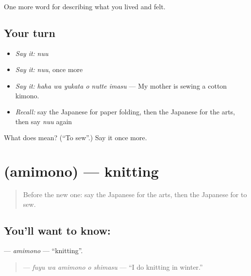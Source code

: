\begin{grammarlens}[title={What you've built}]
One more word for describing what you lived and felt.
\end{grammarlens}

\subsection*{Your turn}
\begin{itemize}
\raggedright
  \item \emph{Say it:} \emph{nuu}
  \item \emph{Say it:} \emph{nuu}, once more
  \item \emph{Say it:} \emph{haha wa yukata o nutte imasu} — My mother is sewing a cotton kimono.
  \item \emph{Recall:} say the Japanese for paper folding, then the Japanese for the arts, then say \emph{nuu} again
\end{itemize}

\begin{tcolorbox}[breakable,colback=teal!4,colframe=teal!35!black,title={Before you move on}]
What does  mean? (\textquotedblleft{}To sew\textquotedblright{}.) Say it once more.
\end{tcolorbox}
\section[\texorpdfstring{\ja{あみもの} (amimono)}{あみもの (amimono)}]{ (amimono) — knitting}

\label{lesson:JA-C467-amimono}



\begin{quote}
Before the new one: say the Japanese for the arts, then the Japanese for to sew.
\end{quote}

\subsection*{You'll want to know: }
\textbf{} — \emph{amimono} — \textquotedblleft{}knitting\textquotedblright{}.

\begin{quote}
\textbf{  } — \emph{fuyu wa amimono o shimasu} — \textquotedblleft{}I do knitting in winter.\textquotedblright{}
\end{quote}

